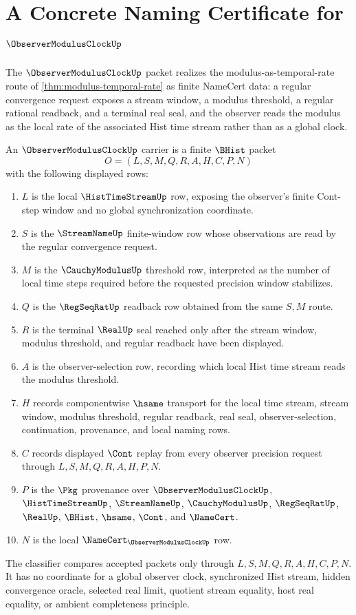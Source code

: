 \chapter{A Concrete Naming Certificate for $\ObserverModulusClockUp$}
\label{ch:concrete-instances-observer-modulus-clock-namecert}

The $\ObserverModulusClockUp$ packet realizes the modulus-as-temporal-rate route of \autoref{thm:modulus-temporal-rate} as finite NameCert data: a regular convergence request exposes a stream window, a modulus threshold, a regular rational readback, and a terminal real seal, and the observer reads the modulus as the local rate of the associated Hist time stream rather than as a global clock.

\begin{definition}
\label{def:observer-modulus-clock-carrier}
An $\ObserverModulusClockUp$ carrier is a finite $\BHist$ packet
$$
O=(L,S,M,Q,R,A,H,C,P,N)
$$
with the following displayed rows:
\begin{enumerate}
\item $L$ is the local $\HistTimeStreamUp$ row, exposing the observer's finite Cont-step window and no global synchronization coordinate.
\item $S$ is the $\StreamNameUp$ finite-window row whose observations are read by the regular convergence request.
\item $M$ is the $\CauchyModulusUp$ threshold row, interpreted as the number of local time steps required before the requested precision window stabilizes.
\item $Q$ is the $\RegSeqRatUp$ readback row obtained from the same $S,M$ route.
\item $R$ is the terminal $\RealUp$ seal reached only after the stream window, modulus threshold, and regular readback have been displayed.
\item $A$ is the observer-selection row, recording which local Hist time stream reads the modulus threshold.
\item $H$ records componentwise $\hsame$ transport for the local time stream, stream window, modulus threshold, regular readback, real seal, observer-selection, continuation, provenance, and local naming rows.
\item $C$ records displayed $\Cont$ replay from every observer precision request through $L,S,M,Q,R,A,H,P,N$.
\item $P$ is the $\Pkg$ provenance over $\ObserverModulusClockUp$, $\HistTimeStreamUp$, $\StreamNameUp$, $\CauchyModulusUp$, $\RegSeqRatUp$, $\RealUp$, $\BHist$, $\hsame$, $\Cont$, and $\NameCert$.
\item $N$ is the local $\NameCert_{\ObserverModulusClockUp}$ row.
\end{enumerate}
The classifier compares accepted packets only through $L,S,M,Q,R,A,H,C,P,N$. It has no coordinate for a global observer clock, synchronized Hist stream, hidden convergence oracle, selected real limit, quotient stream equality, host real equality, or ambient completeness principle.
\end{definition}

